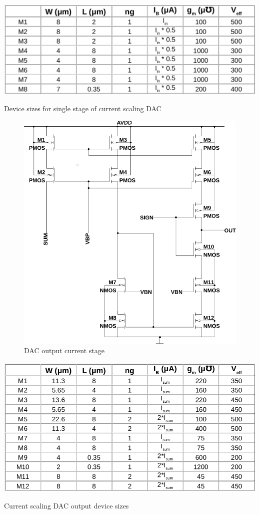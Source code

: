 \documentclass[12pt,oneside,final]{siuethesis}
\theoremstyle{definition}
\begin{document}
\begin{table}[htbp!]
 \centering
 \includegraphics[scale=.4,keepaspectratio=true]{./ch3_figures/dac_bit_sizes.png}
 \caption{Device sizes for single stage of current scaling DAC}
 \label{tab:dac-bit-sizes}
\end{table}

\begin{figure}[htbp!]
\centering
\includegraphics[scale=.6,keepaspectratio=true]{../LTspice_Drawings/dac/dac_out.png} 
\caption{DAC output current stage}
\label{fig:dac-out}
\end{figure}

\begin{table}[htbp!]
 \centering
 \includegraphics[scale=.47,keepaspectratio=true]{./ch3_figures/dac_out_sizes.png}
 \caption{Current scaling DAC output device sizes}
 \label{tab:dac-out-sizes}
\end{table}
\end{document}
